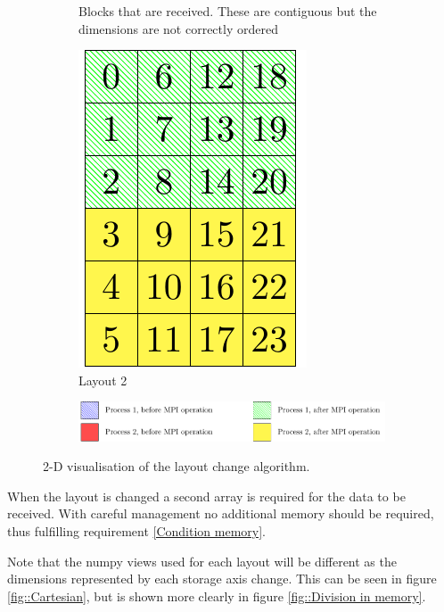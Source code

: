 \begin{figure}[ht]
\begin{center}
\begin{subfigure}[t]{0.5\textwidth}
  \caption{\label{fig::SplitConcat recv blocks}Blocks that are received. These are contiguous but the dimensions are not correctly ordered}
 \end{subfigure}
 \hspace{0.05\textwidth}
 \begin{subfigure}[t]{0.4\textwidth}
  \centering
  \includegraphics[width=.5\textwidth]{Figs/SplitConcat2D/Layout2}
  \caption{\label{fig::SplitConcat layout2} Layout 2}
 \end{subfigure}
 \begin{subfigure}[t]{\textwidth}
  \centering
  \vspace{1em}
  \includegraphics[width=.9\textwidth]{Figs/SplitConcat2D/Legend}
 \end{subfigure}
  \caption{\label{fig::SplitConcat} 2-D visualisation of the layout change algorithm.}
 \end{center}
\end{figure}

When the layout is changed a second array is required for the data to be received. With careful management no additional memory should be required, thus fulfilling requirement \ref{Condition memory}.

Note that the numpy views used for each layout will be different as the dimensions represented by each storage axis change. This can be seen in figure \ref{fig::Cartesian}, but is shown more clearly in figure \ref{fig::Division in memory}.

